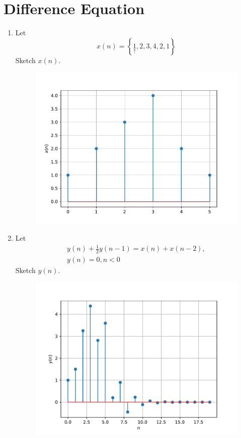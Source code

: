 \documentclass[journal,12pt,twocolumn]{IEEEtran}
\providecommand{\cbrak}[1]{\ensuremath{\left\{#1\right\}}}
\numberwithin{equation}{section}
\renewcommand\thesection{\arabic{section}}
\renewcommand\thesection{\arabic{section}}
\begin{document}
\section{Difference Equation}
\begin{enumerate}[label=\thesection.\arabic*,ref=\thesection.\theenumi]
\item Let
\begin{equation}
x(n) = \cbrak{\underset{\uparrow}{1},2,3,4,2,1}
\end{equation}
Sketch $x(n)$.
\begin{figure}[!ht]
	\begin{center}
	\includegraphics[width=\columnwidth]{figs/3.1 xn}
	\end{center}
	\label{fig:xn}	
	\end{figure}
\item Let
\begin{multline}
\label{eq:iir_filter}
y(n) + \frac{1}{2}y(n-1) = x(n) + x(n-2), 
\\
 y(n) = 0, n < 0
\end{multline}
Sketch $y(n)$.
\begin{figure}[!ht]
	\begin{center}
	\includegraphics[width=\columnwidth]{figs/3.2 yn}

\end{center}
\end{figure}
\end{enumerate}
\end{document}
